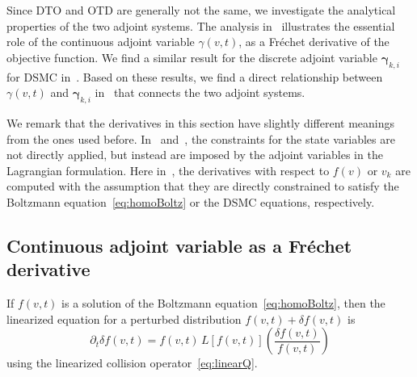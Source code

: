 \documentclass[times,final,nopreprintline]{elsarticle}
\newcommand{\bgamma}{\boldsymbol \gamma}
\begin{document}
Since DTO and OTD are generally not the same, we investigate the analytical properties of the two adjoint systems. The analysis in~ illustrates the essential role of the continuous adjoint variable $\gamma (v,t)$, as a Fr\'echet derivative of the objective function. We find a similar result for  the discrete adjoint variable $\bgamma_{k,i}$ for DSMC  in~. Based on these results, we find a direct relationship between $\gamma (v,t)$ and $\bgamma_{k,i}$ in~ that connects the two adjoint systems.


We remark that the derivatives in this section have slightly different meanings from the ones used before. In~ and~, the constraints for the state variables are not directly applied, but instead are imposed by the adjoint variables in the Lagrangian formulation. Here in~, the derivatives with respect to $f(v)$ or $v_k$ are computed with the assumption that they are directly constrained to satisfy the Boltzmann equation~\eqref{eq:homoBoltz} or the DSMC equations, respectively.


\subsection{Continuous adjoint variable as a Fr\'echet derivative}\label{sec:true_continuous}

If $f(v,t)$ is a solution of the  Boltzmann equation~\eqref{eq:homoBoltz}, then the linearized equation for a perturbed distribution $f(v,t) + \delta f(v,t)$ is
\begin{equation}\label{eq:new_linear2}
    \partial_t \delta f(v,t) = f(v,t)\, L[f(v,t)]\left(\frac{\delta f(v,t)}{f(v,t)}\right)
\end{equation}
using  the linearized  collision operator~\eqref{eq:linearQ}.
\end{document}
